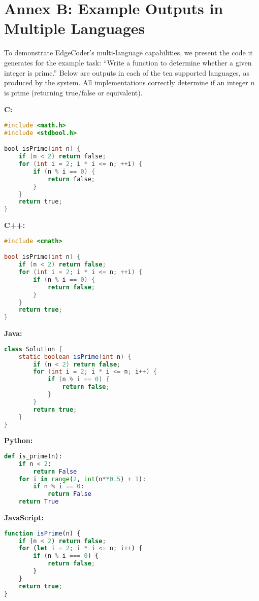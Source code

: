 \documentclass[12pt]{article}
\begin{document}
\section*{Annex B: Example Outputs in Multiple Languages}
\noindent 
To demonstrate EdgeCoder’s multi-language capabilities, we present the code it generates for the example task: “Write a function to determine whether a given integer is prime.” Below are outputs in each of the ten supported languages, as produced by the system. All implementations correctly determine if an integer $n$ is prime (returning true/false or equivalent).

\noindent\textbf{C:}
{\singlespacing
\begin{lstlisting}[language=C]
#include <math.h>
#include <stdbool.h>

bool isPrime(int n) {
    if (n < 2) return false;
    for (int i = 2; i * i <= n; ++i) {
        if (n % i == 0) {
            return false;
        }
    }
    return true;
}
\end{lstlisting}
}

\noindent\textbf{C++:}
{\singlespacing
\begin{lstlisting}[language=C++]
#include <cmath>

bool isPrime(int n) {
    if (n < 2) return false;
    for (int i = 2; i * i <= n; ++i) {
        if (n % i == 0) {
            return false;
        }
    }
    return true;
}
\end{lstlisting}
}

\noindent\textbf{Java:}
{\singlespacing
\begin{lstlisting}[language=Java]
class Solution {
    static boolean isPrime(int n) {
        if (n < 2) return false;
        for (int i = 2; i * i <= n; i++) {
            if (n % i == 0) {
                return false;
            }
        }
        return true;
    }
}
\end{lstlisting}
}

\noindent\textbf{Python:}
{\singlespacing
\begin{lstlisting}[language=Python]
def is_prime(n):
    if n < 2:
        return False
    for i in range(2, int(n**0.5) + 1):
        if n % i == 0:
            return False
    return True
\end{lstlisting}
}

\noindent\textbf{JavaScript:}
{\singlespacing
\begin{lstlisting}[language=JavaScript]
function isPrime(n) {
    if (n < 2) return false;
    for (let i = 2; i * i <= n; i++) {
        if (n % i === 0) {
            return false;
        }
    }
    return true;
}
\end{lstlisting}
}
\end{document}
